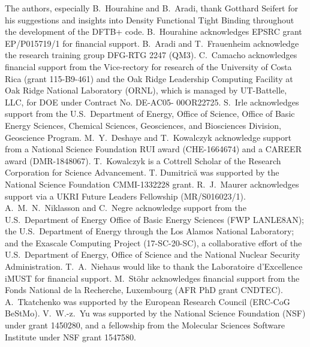 \documentclass{revtex4-1}
\newcommand{\dftbp}{DFTB+}
\begin{document}
\begin{acknowledgments}
  The authors, especially B.~Hourahine and B.~Aradi, thank Gotthard Seifert for
  his suggestions and insights into Density Functional Tight Binding throughout
  the development of the \dftbp{} code. B.~Hourahine acknowledges EPSRC grant
  EP/P015719/1 for financial support. B.~Aradi and T.~Frauenheim acknowledge the
  research training group DFG-RTG 2247 (QM3). C.~Camacho acknowledges financial
  support from the Vice-rectory for research of the University of Costa Rica
  (grant 115-B9-461) and the Oak Ridge Leadership Computing Facility at Oak
  Ridge National Laboratory (ORNL), which is managed by UT-Battelle, LLC, for
  DOE under Contract No. DE-AC05- 00OR22725.  S.~Irle acknowledges support from
  the U.S.\ Department of Energy, Office of Science, Office of Basic Energy
  Sciences, Chemical Sciences, Geosciences, and Biosciences Division, Geoscience
  Program.  M.~Y.~Deshaye and T.~Kowalczyk acknowledge support from a National
  Science Foundation RUI award (CHE-1664674) and a CAREER award
  (DMR-1848067). T.~Kowalczyk is a Cottrell Scholar of the Research Corporation
  for Science Advancement.  T. Dumitric\u{a} was supported by the National
  Science Foundation CMMI-1332228 grant.  R.~J.~Maurer acknowledges support via
  a UKRI Future Leaders Fellowship (MR/S016023/1). A.~M.~N.~Niklasson and
  C.~Negre acknowledge support from the U.S.\ Department of Energy Office of
  Basic Energy Sciences (FWP LANLE8AN); the U.S.\ Department of Energy through
  the Los Alamos National Laboratory; and the Exascale Computing Project
  (17-SC-20-SC), a collaborative effort of the U.S.\ Department of Energy,
  Office of Science and the National Nuclear Security
  Administration. T.~A.~Niehaus would like to thank the Laboratoire d'Excellence
  iMUST for financial support. M.~St\"{o}hr acknowledges financial support from
  the Fonds National de la Recherche, Luxembourg (AFR PhD grant CNDTEC).
  A.~Tkatchenko was supported by the European Research Council (ERC-CoG BeStMo).
  V.~W.-z.~Yu was supported by the National Science Foundation (NSF) under grant
  1450280, and a fellowship from the Molecular Sciences Software Institute under
  NSF grant 1547580.
\end{acknowledgments}




\end{document}
